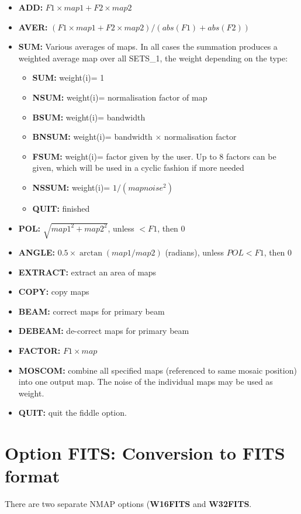 \begin{itemize}
\item {\bf  ADD:}  $F1\times map1 + F2\times map2$
\item {\bf  AVER:}  $(F1\times map1 + F2\times map2)/(abs(F1)+abs(F2))$
\item {\bf  SUM:}  Various averages of maps.
In all cases the summation produces
a weighted average map over all SETS\_1, the weight depending on the type:
  \begin{itemize}
  \item {\bf  SUM:}  weight(i)= 1
  \item {\bf  NSUM:}  weight(i)= normalisation factor of map
  \item {\bf  BSUM:}  weight(i)= bandwidth
  \item {\bf  BNSUM:}  weight(i)= bandwidth $\times$ normalisation factor
  \item {\bf  FSUM:}  weight(i)= factor given by the user.
		Up to 8 factors can be given,
		which will be used in a cyclic fashion if more needed
  \item {\bf  NSSUM:}  weight(i)= $1/(map noise^{2})$
  \item {\bf  QUIT:}  finished
  \end{itemize}
\item {\bf  POL:}  $\sqrt{map1^{2} + map2^{2}}$,
		unless $< F1$, then 0
\item {\bf  ANGLE:}  $0.5\times \arctan{(map1/map2)}$ (radians),
		unless $POL < F1$, then 0
\item {\bf  EXTRACT:}  extract an area of maps
\label{.copy}
\item {\bf  COPY:}  copy maps
\item {\bf  BEAM:}  correct maps for primary beam
\item {\bf  DEBEAM:}  de-correct maps for primary beam
\item {\bf  FACTOR:}  $F1\times map$
\item {\bf  MOSCOM:}  combine all specified maps
		(referenced to same mosaic position) into one output map.
		The noise of the individual maps may be used as weight.
\item {\bf  QUIT:}  quit the fiddle option.
\end{itemize}




\section{Option FITS: Conversion to FITS format}
\label{.fits}

There are two separate NMAP options ({\bf W16FITS} and {\bf W32FITS}.

